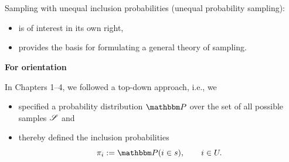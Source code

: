 \documentclass{my_eth_beamer}
\numberwithin{equation}{section}
\begin{document}
\begin{frame}
    \frametitle{\insertsectionnumber~\insertsection}
    Sampling with \alert{unequal} inclusion probabilities (unequal probability
    sampling):

    \vspace{0.25em}

    \begin{itemize}
    \setlength{\itemsep}{8pt}
        \item is of \alert{interest in its own right},
        \item provides the \alert{basis} for formulating a \alert{general theory
            of sampling}.
    \end{itemize}

    \vspace{2em}

    \textbf{\textcolor{fhnwblue}{For orientation}}

    \vspace{0.5em}

    In Chapters 1--4, we followed a \alert{top-down approach}, i.e., we

    \vspace{0.25em}

    \begin{itemize}
    \setlength{\itemsep}{8pt}
        \item specified a \alert{probability distribution} $\PP$ over the set of
            all possible samples $\mathscr{S}$ and
        \item thereby defined the \alert{inclusion probabilities}
            \begin{equation*}
                \pi_i := \PP(i \in s), \qquad i \in U.
            \end{equation*}
    \end{itemize}
\end{frame}
\end{document}
